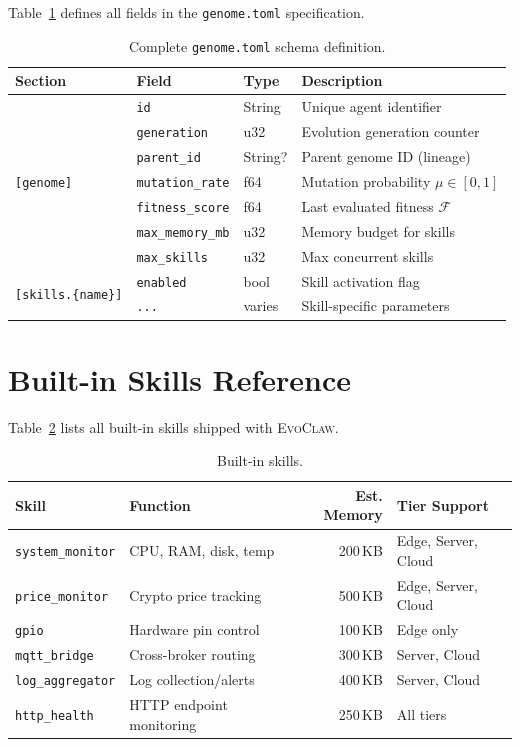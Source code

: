 \documentclass{article}
\newcommand{\evoclaw}{\textsc{EvoClaw}}
\newcommand{\genome}{\texttt{genome.toml}}
\newcommand{\fitnessfn}{\mathcal{F}}
\begin{document}
Table~\ref{tab:schema} defines all fields in the \genome{} specification.

\begin{table}[h]
\centering
\caption{Complete \genome{} schema definition.}
\label{tab:schema}
\small
\begin{tabular}{llll}
\toprule
\textbf{Section} & \textbf{Field} & \textbf{Type} & \textbf{Description} \\
\midrule
\multirow{7}{*}{\texttt{[genome]}}
 & \texttt{id} & String & Unique agent identifier \\
 & \texttt{generation} & u32 & Evolution generation counter \\
 & \texttt{parent\_id} & String? & Parent genome ID (lineage) \\
 & \texttt{mutation\_rate} & f64 & Mutation probability $\mu \in [0,1]$ \\
 & \texttt{fitness\_score} & f64 & Last evaluated fitness $\fitnessfn$ \\
 & \texttt{max\_memory\_mb} & u32 & Memory budget for skills \\
 & \texttt{max\_skills} & u32 & Max concurrent skills \\
\midrule
\multirow{2}{*}{\texttt{[skills.\{name\}]}}
 & \texttt{enabled} & bool & Skill activation flag \\
 & \texttt{...} & varies & Skill-specific parameters \\
\bottomrule
\end{tabular}
\end{table}


\section{Built-in Skills Reference}
\label{app:skills}

Table~\ref{tab:builtin_skills} lists all built-in skills shipped with \evoclaw{}.

\begin{table}[h]
\centering
\caption{Built-in skills.}
\label{tab:builtin_skills}
\small
\begin{tabular}{llrl}
\toprule
\textbf{Skill} & \textbf{Function} & \textbf{Est. Memory} & \textbf{Tier Support} \\
\midrule
\texttt{system\_monitor} & CPU, RAM, disk, temp & 200\,KB & Edge, Server, Cloud \\
\texttt{price\_monitor} & Crypto price tracking & 500\,KB & Edge, Server, Cloud \\
\texttt{gpio} & Hardware pin control & 100\,KB & Edge only \\
\texttt{mqtt\_bridge} & Cross-broker routing & 300\,KB & Server, Cloud \\
\texttt{log\_aggregator} & Log collection/alerts & 400\,KB & Server, Cloud \\
\texttt{http\_health} & HTTP endpoint monitoring & 250\,KB & All tiers \\
\bottomrule
\end{tabular}
\end{table}
\end{document}
